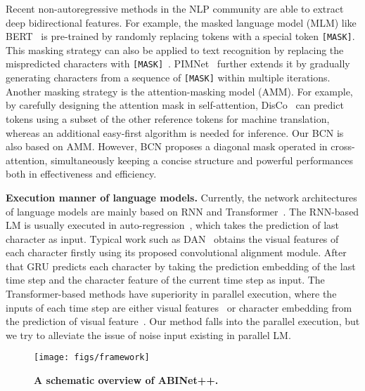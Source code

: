 \documentclass[10pt,journal,compsoc]{IEEEtran}
\begin{document}
Recent non-autoregressive methods in the NLP community are able to extract deep bidirectional features. For example, the masked language model (MLM) like BERT~\cite{devlin2018bert} is pre-trained by randomly replacing tokens with a special token {\tt{[MASK]}}. This masking strategy can also be applied to text recognition by replacing the mispredicted characters with {\tt{[MASK]}}~\cite{bhunia2021joint}. PIMNet~\cite{qiao2021pimnet} further extends it by gradually generating characters from a sequence of {\tt{[MASK]}} within multiple iterations. Another masking strategy is the attention-masking model (AMM). For example, by carefully designing the attention mask in self-attention, DisCo~\cite{kasai2020non} can predict tokens using a subset of the other reference tokens for machine translation, whereas an additional easy-first algorithm is needed for inference. Our BCN is also based on AMM. However, BCN proposes a diagonal mask operated in cross-attention, simultaneously keeping a concise structure and powerful performances both in effectiveness and efficiency.


\noindent\textbf{Execution manner of language models.} Currently, the network architectures of language models are mainly based on RNN and Transformer~\cite{vaswani2017attention}. The RNN-based LM is usually executed in auto-regression~\cite{wang2020decoupled,cheng2017focusing,wojna2017attention}, which takes the prediction of last character as input. Typical work such as DAN~\cite{wang2020decoupled} obtains the visual features of each character firstly using its proposed convolutional alignment module. After that GRU predicts each character by taking the prediction embedding of the last time step and the character feature of the current time step as input. The Transformer-based methods have superiority in parallel execution, where the inputs of each time step are either visual features~\cite{lyu20192d} or character embedding from the prediction of visual feature~\cite{yu2020towards}. Our method falls into the parallel execution, but we try to alleviate the issue of noise input existing in parallel LM.



\begin{figure*}
   \begin{center}
      \texttt{[image: figs/framework]}
      \caption{\textbf{A schematic overview of ABINet++.}}
      \label{fig:framework}
   \end{center}
   \vspace{-2em}
 \end{figure*}
\end{document}
